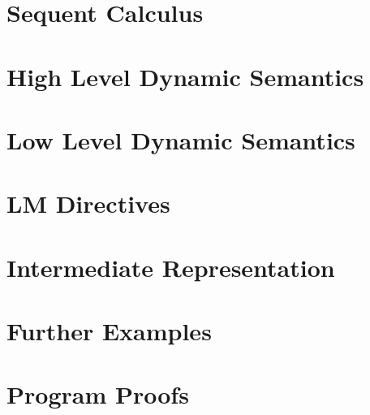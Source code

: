 \chapter{Sequent Calculus}\label{sec:fragment}


\chapter{High Level Dynamic Semantics}\label{sec:hld}


\chapter{Low Level Dynamic Semantics}\label{sec:lld}


\chapter{LM Directives}\label{appendix:directives}


\chapter{Intermediate Representation}\label{appendix:vm}

\chapter{Further Examples}

\chapter{Program Proofs}

